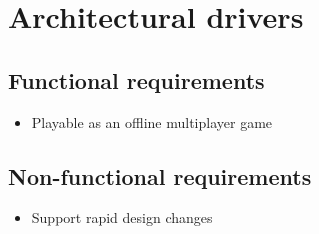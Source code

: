 \chapter{Architectural drivers}
\cite{adams1995hitchhiker}
\section{Functional requirements}
\begin{itemize}
	\item{Playable as an offline multiplayer game}
\end{itemize}

\section{Non-functional requirements}
\begin{itemize}
	\item{Support rapid design changes}
\end{itemize}